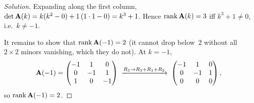 \begin{proof}[Solution]
Expanding along the first column,
$\det \mathbf{A}(k) = k(k^2 - 0) + 1\,(1 \cdot 1 - 0) = k^3 + 1$. Hence
$\operatorname{rank} \mathbf{A}(k) = 3$ iff $k^3 + 1 \neq 0$, i.e.\ $k \neq -1$.

It remains to show that $\operatorname{rank} \mathbf{A}(-1) = 2$ (it cannot drop below~$2$
without all $2 \times 2$ minors vanishing, which they do not). At
$k = -1$,
\[
  \mathbf{A}(-1) =
  \begin{pmatrix}
    -1 & 1 & 0 \\
    0 & -1 & 1 \\
    1 & 0 & -1
  \end{pmatrix}
  \;\xrightarrow{R_3 \to R_3 + R_1 + R_2}\;
  \begin{pmatrix}
    -1 & 1 & 0 \\
    0 & -1 & 1 \\
    0 & 0 & 0
  \end{pmatrix},
\]
so $\operatorname{rank} \mathbf{A}(-1) = 2$.
\end{proof}
